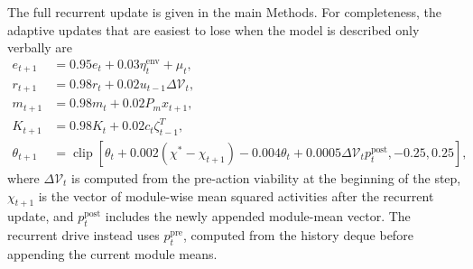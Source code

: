 \documentclass[11pt]{article}
\newcommand{\Vcal}{\mathcal{V}}
\begin{document}
The full recurrent update is given in the main Methods. For completeness, the adaptive updates that are easiest to lose when the model is described only verbally are
\begin{align}
 e_{t+1}&=0.95e_t+0.03\eta^{\mathrm{env}}_t+\mu_t,\\
 r_{t+1}&=0.98r_t+0.02u_{t-1}\Delta\Vcal_t,\\
 m_{t+1}&=0.98m_t+0.02P_mx_{t+1},\\
 K_{t+1}&=0.98K_t+0.02c_t\zeta_{t-1}^{T},\\
 \theta_{t+1}&=\operatorname{clip}\!\left[\theta_t+0.002(\chi^*-\chi_{t+1})-0.004\theta_t+0.0005\Delta\Vcal_t p^{\mathrm{post}}_t,-0.25,0.25\right],
\end{align}
where $\Delta\Vcal_t$ is computed from the pre-action viability at the beginning of the step, $\chi_{t+1}$ is the vector of module-wise mean squared activities after the recurrent update, and $p^{\mathrm{post}}_t$ includes the newly appended module-mean vector. The recurrent drive instead uses $p^{\mathrm{pre}}_t$, computed from the history deque before appending the current module means.
\end{document}
